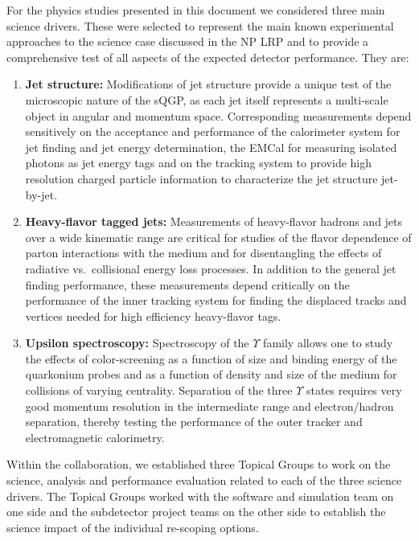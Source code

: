 For the physics studies presented in this document we considered three
main science drivers. These were selected to represent the main known 
experimental approaches to the science case discussed in the NP LRP and
to provide a comprehensive test of all aspects of the expected detector
performance. They are:
\begin{enumerate}
\item {\bf Jet structure:} Modifications of jet structure provide a unique test
of the microscopic nature of the sQGP, as each jet itself represents a multi-scale
object in angular and momentum space. Corresponding measurements depend
sensitively on the acceptance and performance 
of the calorimeter system for jet finding and jet energy determination, the
EMCal for measuring isolated photons as jet energy tags and on the tracking
system to provide high resolution charged particle information to characterize
the jet structure jet-by-jet.
\item {\bf Heavy-flavor tagged jets:} Measurements of heavy-flavor hadrons 
and jets over a wide kinematic range are critical for studies of
the flavor dependence of parton interactions with the medium and for 
disentangling the effects of radiative vs.\ collisional energy loss processes.
In addition to the general jet finding performance, these measurements depend 
critically on the performance of the inner tracking system for finding the displaced 
tracks and vertices needed for high efficiency heavy-flavor tags.
\item {\bf Upsilon spectroscopy:} Spectroscopy of the $\Upsilon$ family allows
one to study the effects of color-screening as a function of size and 
binding energy of the quarkonium probes and as a function of density and size
of the medium for collisions of varying centrality. Separation of the three 
$\Upsilon$ states requires very good momentum resolution in the intermediate
\pt range and electron/hadron separation, thereby testing the performance of 
the outer tracker and electromagnetic calorimetry. 
\end{enumerate}

Within the collaboration, we established three Topical Groups to work 
on the science, analysis and performance evaluation related to each of the 
three science drivers. The Topical Groups worked with the software and simulation
team on one side and the subdetector project teams on the other side to 
establish the science impact of the individual re-scoping options.






